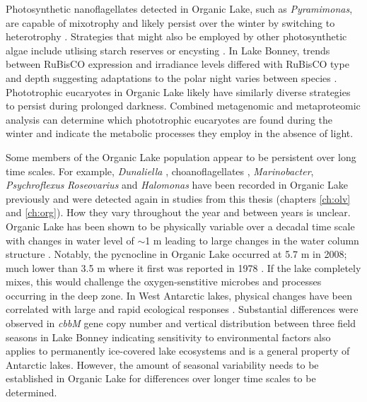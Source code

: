 Photosynthetic nanoflagellates detected in Organic Lake, such as \emph{Pyramimonas}, are capable of mixotrophy \cite{Bell2003} and likely persist over the winter by switching to heterotrophy \cite{Laybourn-Parry2005}.
Strategies that might also be employed by other photosynthetic algae include utlising starch reserves or encysting \cite{Laybourn-Parry2002}.
In Lake Bonney, trends between \acs{RuBisCO} expression and irradiance levels differed with \acs{RuBisCO} type and depth suggesting adaptations to the polar night varies between species \cite{Kong2012a}.
Phototrophic eucaryotes in Organic Lake likely have similarly diverse strategies to persist during prolonged darkness.
Combined metagenomic and metaproteomic analysis can determine which phototrophic eucaryotes are found during the winter and indicate the metabolic processes they employ in the absence of light.

Some members of the Organic Lake population appear to be persistent over long time scales.
For example, \emph{Dunaliella} \cite{Franzmann1987b}, choanoflagellates \cite{vandenHoff1986}, \emph{Marinobacter}, \emph{Psychroflexus} \emph{Roseovarius} and \emph{Halomonas} \cite{Bowman2000a} have been recorded in Organic Lake previously and were detected again in studies from this thesis (chapters \ref{ch:olv} and \ref{ch:org}).
How they vary throughout the year and between years is unclear.
Organic Lake has been shown to be physically variable over a decadal time scale with changes in water level of $\sim$1 m leading to large changes in the water column structure \cite{Gibson1995, Gibson1996}.
Notably, the pycnocline in Organic Lake occurred at 5.7 m in 2008; much lower than 3.5 m where it first was reported in 1978 \cite{Franzmann1987b}.
If the lake completely mixes, this would challenge the oxygen-senstitive microbes and processes occurring in the deep zone.
In West Antarctic lakes, physical changes have been correlated with large and rapid ecological responses \cite{Quayle2002}.
Substantial differences were observed in \emph{cbbM} gene copy number and vertical distribution between three field seasons in Lake Bonney \cite{Kong2012b} indicating sensitivity to environmental factors also applies to permanently ice-covered lake ecosystems and is a general property of Antarctic lakes.
However, the amount of seasonal variability needs to be established in Organic Lake for differences over longer time scales to be determined.

